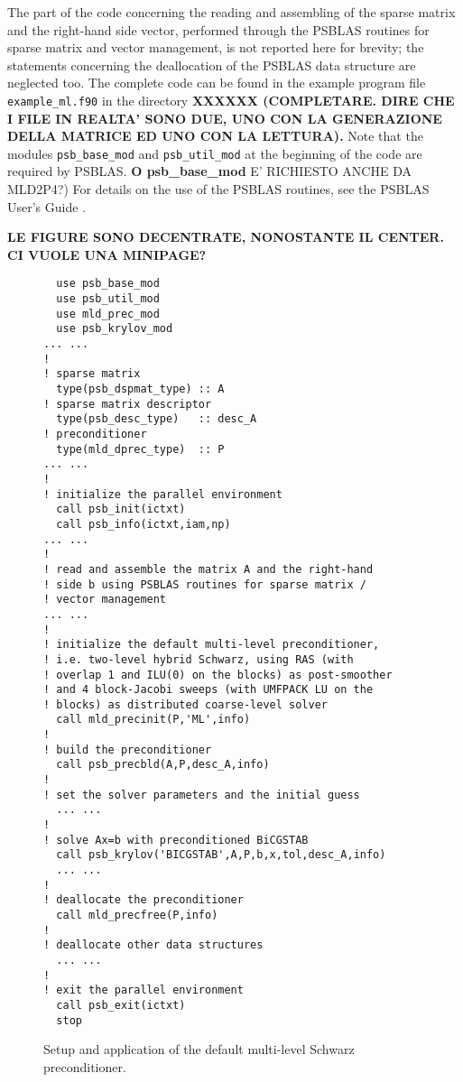 The part of the code concerning the
reading and assembling of the sparse matrix and the right-hand side vector, performed
through the PSBLAS routines for sparse matrix and vector management, is not reported
here for brevity; the statements concerning the deallocation of the PSBLAS data structure
are neglected too.
The complete code can be found in the example program file \verb|example_ml.f90|
in the directory \textbf{XXXXXX (COMPLETARE. DIRE CHE I FILE IN REALTA' SONO DUE, UNO CON
LA GENERAZIONE DELLA MATRICE ED UNO CON LA LETTURA).} Note that the modules \verb|psb_base_mod|
and \verb|psb_util_mod| at the beginning of the code are required by PSBLAS.
\textbf{O psb\_base\_mod} E' RICHIESTO ANCHE DA MLD2P4?)
For details on the use of the PSBLAS routines, see the PSBLAS User's Guide \cite{PSBLASGUIDE}.

\textbf{LE FIGURE SONO DECENTRATE, NONOSTANTE IL CENTER. CI VUOLE UNA MINIPAGE?}

\begin{figure}[tbp]
\begin{center}
{\small
\begin{verbatim}
  use psb_base_mod
  use psb_util_mod 
  use mld_prec_mod
  use psb_krylov_mod
... ...
!
! sparse matrix
  type(psb_dspmat_type) :: A
! sparse matrix descriptor
  type(psb_desc_type)   :: desc_A
! preconditioner
  type(mld_dprec_type)  :: P
... ...
!
! initialize the parallel environment
  call psb_init(ictxt)
  call psb_info(ictxt,iam,np)
... ...
!
! read and assemble the matrix A and the right-hand
! side b using PSBLAS routines for sparse matrix /
! vector management
... ...
!
! initialize the default multi-level preconditioner,
! i.e. two-level hybrid Schwarz, using RAS (with
! overlap 1 and ILU(0) on the blocks) as post-smoother
! and 4 block-Jacobi sweeps (with UMFPACK LU on the
! blocks) as distributed coarse-level solver
  call mld_precinit(P,'ML',info)
!
! build the preconditioner
  call psb_precbld(A,P,desc_A,info)
!
! set the solver parameters and the initial guess
  ... ...
!
! solve Ax=b with preconditioned BiCGSTAB
  call psb_krylov('BICGSTAB',A,P,b,x,tol,desc_A,info)
  ... ...
!
! deallocate the preconditioner
  call mld_precfree(P,info)
!
! deallocate other data structures
  ... ...
!
! exit the parallel environment
  call psb_exit(ictxt)
  stop
\end{verbatim}
}
\caption{Setup and application of the default multi-level Schwarz preconditioner.
\label{fig:ex_default}}
\end{center}
\end{figure}

